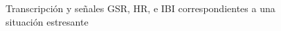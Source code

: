 \begin{figure}[h]
        \centering
        \caption{Transcripci\'on y se\~nales GSR, HR, e IBI correspondientes a una situaci\'on estresante}\label{fig:imgsegment}
\end{figure}
\newpage

